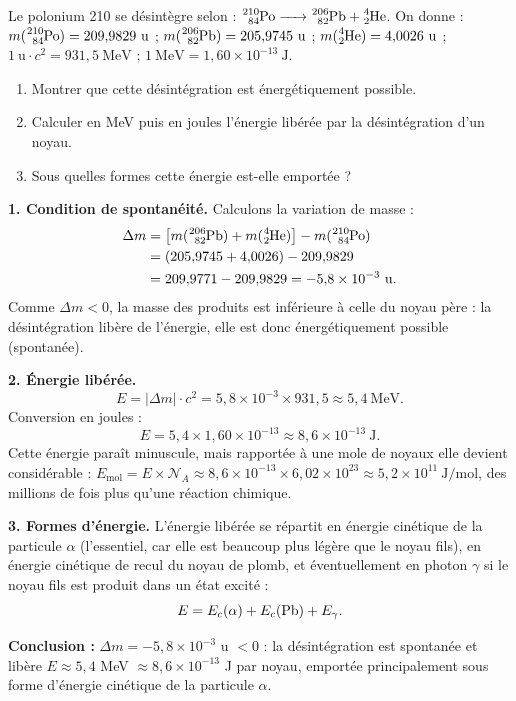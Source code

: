 \documentclass[11pt]{article}
\begin{document}
\begin{exoresolu}
Le polonium 210 se désintègre selon : $\ce{^{210}_{84}Po -> ^{206}_{82}Pb + ^{4}_{2}He}$.
On donne : $m(\ce{^{210}_{84}Po}) = 209{,}9829\ \mathrm{u}$ ; $m(\ce{^{206}_{82}Pb}) = 205{,}9745\ \mathrm{u}$ ; $m(\ce{^{4}_{2}He}) = 4{,}0026\ \mathrm{u}$ ; $1\ \mathrm{u} \cdot c^2 = 931{,}5\ \mathrm{MeV}$ ; $1\ \mathrm{MeV} = 1{,}60 \times 10^{-13}\ \mathrm{J}$.
\begin{enumerate}
\item Montrer que cette désintégration est énergétiquement possible.
\item Calculer en MeV puis en joules l'énergie libérée par la désintégration d'un noyau.
\item Sous quelles formes cette énergie est-elle emportée ?
\end{enumerate}
\tcblower
\textbf{1. Condition de spontanéité.} Calculons la variation de masse :
\begin{align*}
\Delta m &= \left[m(\ce{^{206}_{82}Pb}) + m(\ce{^{4}_{2}He})\right] - m(\ce{^{210}_{84}Po}) \\
&= (205{,}9745 + 4{,}0026) - 209{,}9829 \\
&= 209{,}9771 - 209{,}9829 = -5{,}8 \times 10^{-3}\ \mathrm{u}.
\end{align*}
Comme $\Delta m < 0$, la masse des produits est inférieure à celle du noyau père : la désintégration libère de l'énergie, elle est donc énergétiquement possible (spontanée).

\textbf{2. Énergie libérée.}
\[ E = |\Delta m|\cdot c^2 = 5{,}8 \times 10^{-3} \times 931{,}5 \approx 5{,}4\ \mathrm{MeV}. \]
Conversion en joules :
\[ E = 5{,}4 \times 1{,}60 \times 10^{-13} \approx 8{,}6 \times 10^{-13}\ \mathrm{J}. \]
Cette énergie paraît minuscule, mais rapportée à une mole de noyaux elle devient considérable : $E_{\text{mol}} = E \times \mathcal{N}_A \approx 8{,}6 \times 10^{-13} \times 6{,}02 \times 10^{23} \approx 5{,}2 \times 10^{11}\ \mathrm{J/mol}$, des millions de fois plus qu'une réaction chimique.

\textbf{3. Formes d'énergie.} L'énergie libérée se répartit en énergie cinétique de la particule $\alpha$ (l'essentiel, car elle est beaucoup plus légère que le noyau fils), en énergie cinétique de recul du noyau de plomb, et éventuellement en photon $\gamma$ si le noyau fils est produit dans un état excité :
\[ E = E_c(\alpha) + E_c(\ce{Pb}) + E_\gamma. \]

\textbf{Conclusion :} $\Delta m = -5{,}8 \times 10^{-3}$ u $< 0$ : la désintégration est spontanée et libère $E \approx 5{,}4$ MeV $\approx 8{,}6 \times 10^{-13}$ J par noyau, emportée principalement sous forme d'énergie cinétique de la particule $\alpha$.
\end{exoresolu}
\end{document}
